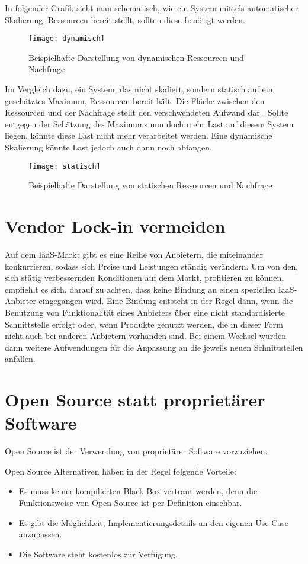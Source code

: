 In folgender Grafik sieht man schematisch, wie ein System mittels automatischer
Skalierung,
Ressourcen bereit stellt, sollten diese benötigt werden.

\begin{figure}[H]
\centering
\texttt{[image: dynamisch]}
\caption{Beispielhafte Darstellung von dynamischen Ressourcen und Nachfrage}
\end{figure}

Im Vergleich dazu, ein System, das nicht skaliert, sondern statisch auf ein
geschätztes Maximum, Ressourcen bereit hält.
Die Fläche zwischen den Ressourcen und der Nachfrage stellt den verschwendeten
Aufwand dar \cite{masteroslo}. Sollte entgegen der Schätzung
des Maximums nun doch mehr Last auf diesem System liegen, k\"onnte
diese Last nicht mehr verarbeitet werden. Eine dynamische Skalierung könnte
Last jedoch auch dann noch abfangen.

\begin{figure}[H]
\centering
\texttt{[image: statisch]}
\caption{Beispielhafte Darstellung von statischen Ressourcen und Nachfrage}
\end{figure}

\section{Vendor Lock-in vermeiden}
Auf dem IaaS-Markt gibt es eine Reihe von Anbietern, die miteinander
konkurrieren, sodass sich
Preise und Leistungen ständig verändern.
Um von den, sich stätig verbessernden Konditionen auf dem Markt, profitieren
zu können,
empfiehlt es sich, darauf zu achten, dass keine Bindung an einen speziellen
IaaS-Anbieter eingegangen wird.
Eine Bindung entsteht in der Regel dann, wenn die Benutzung von Funktionalität
eines Anbieters über eine nicht standardisierte Schnittstelle erfolgt oder, wenn
Produkte genutzt werden, die in dieser Form
nicht auch bei anderen Anbietern vorhanden sind.
Bei einem Wechsel würden dann weitere Aufwendungen für die Anpassung
an die jeweils neuen Schnittstellen anfallen.

\section{Open Source statt proprietärer Software}
Open Source ist der Verwendung von proprietärer Software vorzuziehen.

Open Source Alternativen haben in der Regel folgende Vorteile:
\begin{itemize}
  \item Es muss keiner kompilierten Black-Box vertraut werden,
  denn die Funktionsweise von Open Source ist per Definition einsehbar.
  \item Es gibt die Möglichkeit, Implementierungsdetails an den eigenen Use Case
  anzupassen.
  \item Die Software steht kostenlos zur Verfügung.
\end{itemize}

